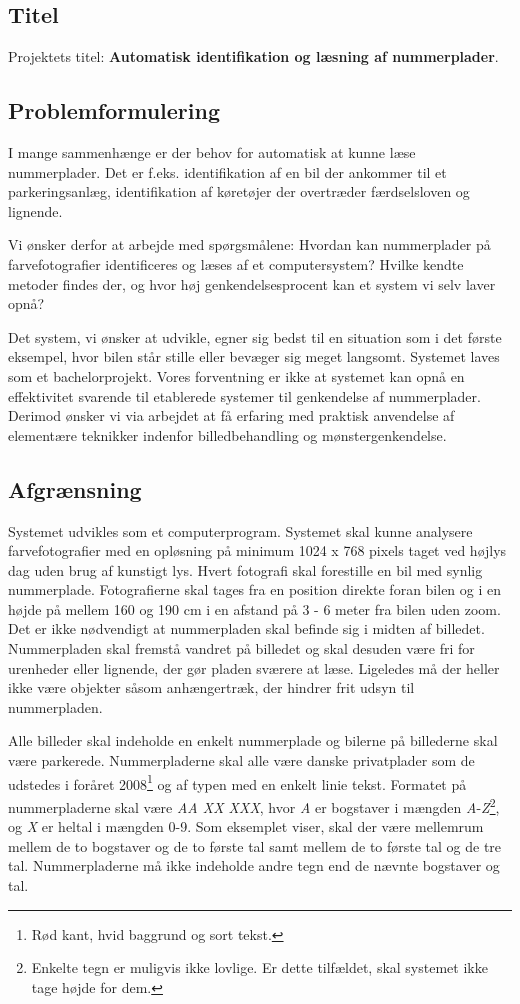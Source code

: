 \subsection*{Titel}
Projektets titel: \textbf{Automatisk identifikation og læsning af nummerplader}.
\subsection*{Problemformulering}
I mange sammenhænge er der behov for automatisk at kunne læse nummerplader. Det er f.eks. identifikation af en bil der ankommer til et parkeringsanlæg, identifikation af køretøjer der overtræder færdselsloven og lignende.

Vi ønsker derfor at arbejde med spørgsmålene: Hvordan kan nummerplader på farvefotografier identificeres og læses af et computersystem? Hvilke kendte metoder findes der, og hvor høj genkendelsesprocent kan et system vi selv laver opnå?

Det system, vi ønsker at udvikle, egner sig bedst til en situation som i det første eksempel, hvor bilen står stille eller bevæger sig meget langsomt. Systemet laves som et bachelorprojekt. Vores forventning er ikke at systemet kan opnå en effektivitet svarende til etablerede systemer til genkendelse af nummerplader. Derimod ønsker vi via arbejdet at få erfaring med praktisk anvendelse af elementære teknikker indenfor billedbehandling og mønstergenkendelse.


\subsection*{Afgrænsning}
Systemet udvikles som et computerprogram. Systemet skal kunne analysere farvefotografier med en opløsning på minimum 1024 x 768 pixels taget ved højlys dag uden brug af kunstigt lys. Hvert fotografi skal forestille en bil med synlig nummerplade. Fotografierne skal tages fra en position direkte foran bilen og i en højde på mellem 160 og 190 cm i en afstand på 3 - 6 meter fra bilen uden zoom. Det er ikke nødvendigt at nummerpladen skal befinde sig i midten af billedet. Nummerpladen skal fremstå vandret på billedet og skal desuden være fri for urenheder eller lignende, der gør pladen sværere at læse. Ligeledes må der heller ikke være objekter såsom anhængertræk, der hindrer frit udsyn til nummerpladen.

Alle billeder skal indeholde en enkelt nummerplade og bilerne på billederne skal være parkerede. Nummerpladerne skal alle være danske privatplader som de udstedes i foråret 2008\footnote{Rød kant, hvid baggrund og sort tekst.} og af typen med en enkelt linie tekst. Formatet på nummerpladerne skal være \textit{AA XX XXX}, hvor \textit{A} er bogstaver i mængden \textit{A}-\textit{Z}\footnote{Enkelte tegn er muligvis ikke lovlige. Er dette tilfældet, skal systemet ikke tage højde for dem.}, og \textit{X} er heltal i mængden 0-9. Som eksemplet viser, skal der være mellemrum mellem de to bogstaver og de to første tal samt mellem de to første tal og de tre tal. Nummerpladerne må ikke indeholde andre tegn end de nævnte bogstaver og tal.


